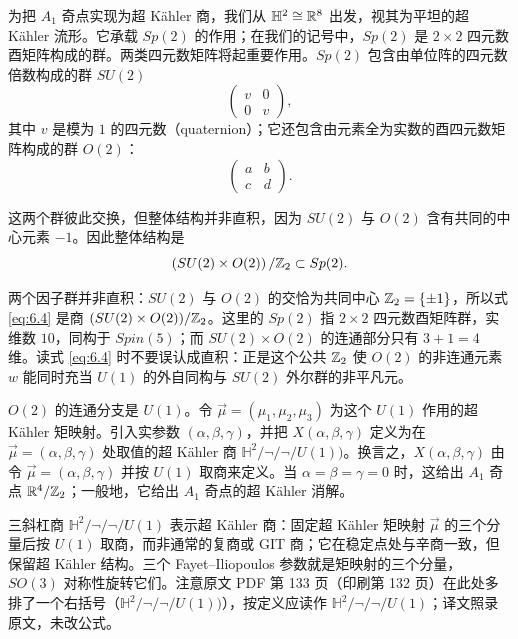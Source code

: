 为把 $A_1$ 奇点实现为超 Kähler 商，我们从 $\mathbb{H}^2\cong {\mathbb{R}}^8$ 出发，视其为平坦的超 Kähler 流形。它承载 $Sp(2)$ 的作用；在我们的记号中，$Sp(2)$ 是 $2\times 2$ 四元数酉矩阵构成的群。两类四元数矩阵将起重要作用。$Sp(2)$ 包含由单位阵的四元数倍数构成的群 $SU(2)$
\setcounter{equation}{1}
\begin{equation}\label{eq:6.2}
  \left(\begin{matrix}v&0\\ 0&v\end{matrix}\right),
\end{equation}
其中 $v$ 是模为 $1$ 的四元数（quaternion）；它还包含由元素全为实数的酉四元数矩阵构成的群 $O(2)$：
\setcounter{equation}{2}
\begin{equation}\label{eq:6.3}
  \left(\begin{matrix}a&b\\ c&d\end{matrix}\right).
\end{equation}

这两个群彼此交换，但整体结构并非直积，因为 $SU(2)$ 与 $O(2)$ 含有共同的中心元素 $-1$。因此整体结构是
\setcounter{equation}{3}
\begin{equation}\label{eq:6.4}
  \left(SU(2)\times O(2)\right)/{\mathbb{Z}}_2\subset Sp(2).
\end{equation}

\begin{yizhu}[易错点]两个因子群并非直积：$SU(2)$ 与 $O(2)$ 的交恰为共同中心 ${\mathbb{Z}}_2=\{\pm 1\}$，所以式 \eqref{eq:6.4} 是商 $(SU(2)\times O(2))/{\mathbb{Z}}_2$。这里的 $Sp(2)$ 指 $2\times 2$ 四元数酉矩阵群，实维数 $10$，同构于 $Spin(5)$；而 $SU(2)\times O(2)$ 的连通部分只有 $3+1=4$ 维。读式 \eqref{eq:6.4} 时不要误认成直积：正是这个公共 ${\mathbb{Z}}_2$ 使 $O(2)$ 的非连通元素 $w$ 能同时充当 $U(1)$ 的外自同构与 $SU(2)$ 外尔群的非平凡元。\end{yizhu}


$O(2)$ 的连通分支是 $U(1)$。令 $\vec \mu=(\mu_1,\mu_2,\mu_3)$ 为这个 $U(1)$ 作用的超 Kähler 矩映射。引入实参数 $(\alpha,\beta,\gamma)$，并把 $X(\alpha,\beta,\gamma)$ 定义为在 $\vec\mu=(\alpha,\beta,\gamma)$ 处取值的超 Kähler 商 $\mathbb{H}^2/\neg/\neg/U(1))$。换言之，$X(\alpha,\beta,\gamma)$ 由令 $\vec\mu=(\alpha,\beta,\gamma)$ 并按 $U(1)$ 取商来定义。当 $\alpha=\beta=\gamma=0$ 时，这给出 $A_1$ 奇点 ${\mathbb{R}}^4/{\mathbb{Z}}_2$；一般地，它给出 $A_1$ 奇点的超 Kähler 消解。

\begin{yizhu}[易错点]三斜杠商 $\mathbb{H}^2/\neg/\neg/U(1)$ 表示超 Kähler 商：固定超 Kähler 矩映射 $\vec\mu$ 的三个分量后按 $U(1)$ 取商，而非通常的复商或 GIT 商；它在稳定点处与辛商一致，但保留超 Kähler 结构。三个 Fayet–Iliopoulos 参数就是矩映射的三个分量，$SO(3)$ 对称性旋转它们。注意原文 PDF 第 133 页（印刷第 132 页）在此处多排了一个右括号（$\mathbb{H}^2/\neg/\neg/U(1))$），按定义应读作 $\mathbb{H}^2/\neg/\neg/U(1)$；译文照录原文，未改公式。\end{yizhu}

